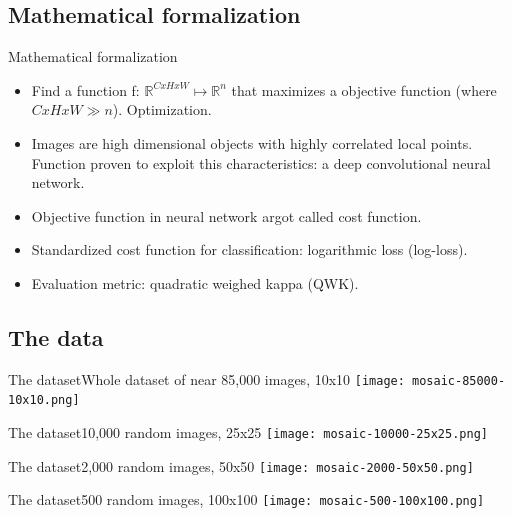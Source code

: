 \documentclass{beamer}
\begin{document}
\subsection{Mathematical formalization}
\begin{frame}{Mathematical formalization}
  \begin{itemize}
  \item {   
    Find a function f: $\mathbb{R}^{CxHxW} 
    \mapsto \mathbb{R}^{n}$ that maximizes a objective function (where $CxHxW \gg n$). \alert{Optimization}.
  }
  \item {
  	Images are high dimensional objects with highly correlated local points.
    Function proven to exploit this characteristics: a \alert{deep convolutional neural network}.
  }
  \item {
    \alert{Objective function} in neural network argot called \alert{cost function}.
  }
  \item {
    Standardized cost function for classification: \alert{logarithmic loss} (log-loss).
  }
  \item {
  	Evaluation metric: \alert{quadratic weighed kappa} (QWK).
  }
  \end{itemize}
\end{frame}

\subsection{The data}

\begin{frame}{The dataset}{Whole dataset of near 85,000 images, 10x10}
	\texttt{[image: mosaic-85000-10x10.png]}	
\end{frame}

\begin{frame}{The dataset}{10,000 random images, 25x25}
	\texttt{[image: mosaic-10000-25x25.png]}	
\end{frame}

\begin{frame}{The dataset}{2,000 random images, 50x50}
	\texttt{[image: mosaic-2000-50x50.png]}	
\end{frame}

\begin{frame}{The dataset}{500 random images, 100x100}
	\texttt{[image: mosaic-500-100x100.png]}	
\end{frame}
\end{document}
